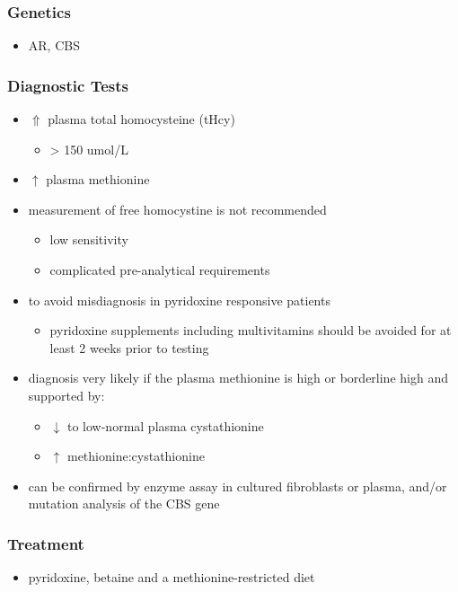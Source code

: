 \documentclass{scrartcl}
\begin{document}
\subsubsection{Genetics}
\label{sec:org17bcaf5}
\begin{itemize}
\item AR, CBS
\end{itemize}

\subsubsection{Diagnostic Tests}
\label{sec:org0119a2e}
\begin{itemize}
\item \(\Uparrow\) plasma total homocysteine (tHcy)
\begin{itemize}
\item \textgreater{} 150 umol/L
\end{itemize}
\item \(\uparrow\) plasma methionine
\item measurement of free homocystine is not recommended
\begin{itemize}
\item low sensitivity
\item complicated pre-analytical requirements
\end{itemize}
\item to avoid misdiagnosis in pyridoxine responsive patients
\begin{itemize}
\item pyridoxine supplements including multivitamins should be avoided
for at least 2 weeks prior to testing
\end{itemize}
\item diagnosis very likely if the plasma methionine is high or borderline
high and supported by:
\begin{itemize}
\item \(\downarrow\) to low-normal plasma cystathionine
\item \(\uparrow\) methionine:cystathionine
\end{itemize}
\item can be confirmed by enzyme assay in cultured fibroblasts or plasma,
and/or mutation analysis of the CBS gene
\end{itemize}

\subsubsection{Treatment}
\label{sec:orga0ae68a}
\begin{itemize}
\item pyridoxine, betaine and a methionine-restricted diet
\end{itemize}
\end{document}
